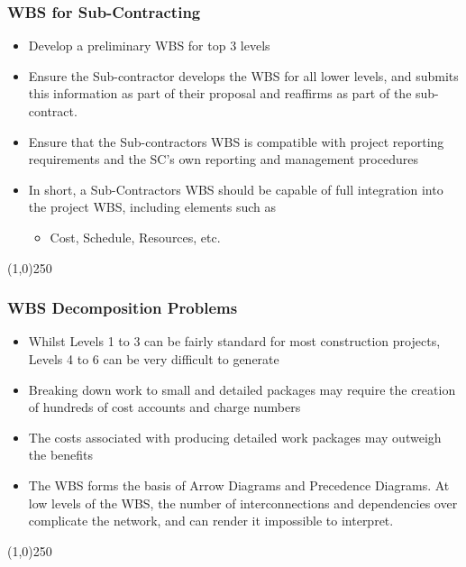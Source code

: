\begin{frame}
\frametitle{WBS for Sub-Contracting}
\begin{itemize}
	\item Develop a preliminary WBS for top 3 levels
	\item Ensure the Sub-contractor develops the WBS for all lower levels, and submits this information as part of their proposal and reaffirms as part of the sub-contract.
	\item Ensure that the Sub-contractors WBS is compatible with project reporting requirements and the SC's own reporting and management procedures
	\item In short, a Sub-Contractors WBS should be capable of full integration into the project WBS, including elements such as
	\begin{itemize}
		\item Cost, Schedule, Resources, etc.
	\end{itemize}
\end{itemize}
\end{frame}\begin{center}\line(1,0){250}\end{center}



\begin{frame}
\frametitle{WBS Decomposition Problems}
\begin{itemize}
	\item Whilst Levels 1 to 3 can be fairly standard for most construction projects, Levels 4 to 6 can be very difficult to generate
	\item Breaking down work to small and detailed packages may require the creation of hundreds of cost accounts and charge numbers
	\item The costs associated with producing detailed work packages may outweigh the benefits
	\item The WBS forms the basis of Arrow Diagrams and Precedence Diagrams.  At low levels of the WBS, the number of interconnections and dependencies over complicate the network, and can render it impossible to interpret.
\end{itemize}
\end{frame}\begin{center}\line(1,0){250}\end{center}



